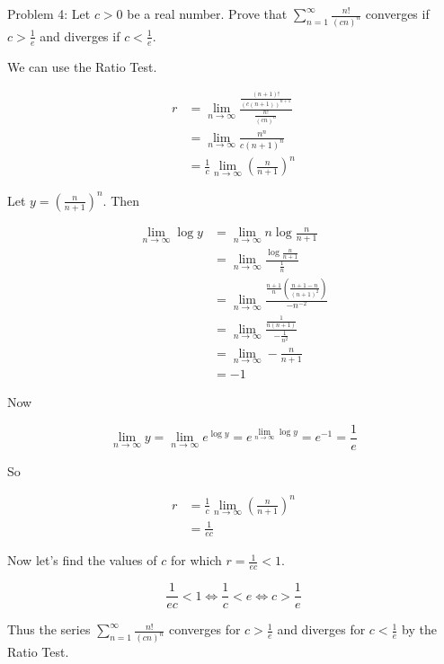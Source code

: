 Problem 4: Let $c > 0$ be a real number. Prove that $\displaystyle \sum_{n=1}^\infty \frac{n!}{(cn)^n}$ converges if $c > \frac{1}{e}$ and diverges if $c < \frac{1}{e}$.

We can use the Ratio Test.

\begin{align*}
r &= \lim_{n \rightarrow \infty} \frac{\frac{(n+1)!}{(c(n+1))^{n+1}}}{\frac{n!}{(cn)^{n}}} \\
&= \lim_{n \rightarrow \infty} \frac{n^n}{c(n+1)^{n}} \\
&= \frac{1}{c} \lim_{n \rightarrow \infty} \left(\frac{n}{n+1}\right)^n
\end{align*}

Let $y = \left(\frac{n}{n+1}\right)^n$. Then

\begin{align*}
\lim_{n \rightarrow \infty} \log y &= \lim_{n \rightarrow \infty} n \log{\frac{n}{n+1}} \\
&= \lim_{n \rightarrow \infty} \frac{\log{\frac{n}{n+1}}}{\frac{1}{n}} \\
&= \lim_{n \rightarrow \infty} \frac{\frac{n+1}{n} \left(\frac{n+1 - n}{(n+1)^2}\right)}{-n^{-2}} \\
&= \lim_{n \rightarrow \infty} \frac{\frac{1}{n(n+1)}}{-\frac{1}{n^2}} \\
&= \lim_{n \rightarrow \infty} - \frac{n}{n+1} \\
&= -1
\end{align*}

Now

$$ \lim_{n \rightarrow \infty} y = \lim_{n \rightarrow \infty} e^{\log y} = e^{\lim_{n \rightarrow \infty} \log y} = e^{-1} = \frac{1}{e} $$

So

\begin{align*}
r &= \frac{1}{c} \lim_{n \rightarrow \infty} \left(\frac{n}{n+1}\right)^n \\
&= \frac{1}{ec}
\end{align*}

Now let's find the values of $c$ for which $r = \frac{1}{ec} < 1$.

$$ \frac{1}{ec} < 1 \iff \frac{1}{c} < e \iff c > \frac{1}{e} $$

Thus the series $\displaystyle \sum_{n=1}^{\infty} \frac{n!}{(cn)^n}$ converges for $\displaystyle c > \frac{1}{e}$ and diverges for $\displaystyle c < \frac{1}{e}$ by the Ratio Test.
